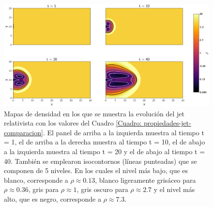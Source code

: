 \documentclass[12pt,a4paper]{book}
\begin{document}
\begin{figure}
  \centering
  \includegraphics[width=1\textwidth]{./Figuras/jet/evolucion/evolucion.png}
    \caption{Mapas de densidad en los que se muestra la evolución del jet relativista 
    con los valores del Cuadro 
    \ref{Cuadro: propiedades-jet-comparacion}. El panel de arriba a la izquierda muestra al 
    tiempo t = 1, el de arriba a la derecha muestra al tiempo t = 10, 
    el de abajo a la izquierda muestra al tiempo t = 20 y el de abajo al tiempo t = 40.
    También se emplearon isocontornos (líneas punteadas) que se componen de 5 niveles. En los 
    cuales el nivel más bajo, que es blanco, corresponde a $\rho \approx 0.13$, blanco ligeramente grisáceo 
    para $\rho \approx 0.36$,
    gris para $\rho \approx 1$, gris oscuro para $\rho  \approx 2.7$ y el nivel más alto, que es negro, 
    corresponde a $\rho \approx 7.3$.}
    \label{fig:evolucion_temporal_del_jet}
\end{figure}
\end{document}
